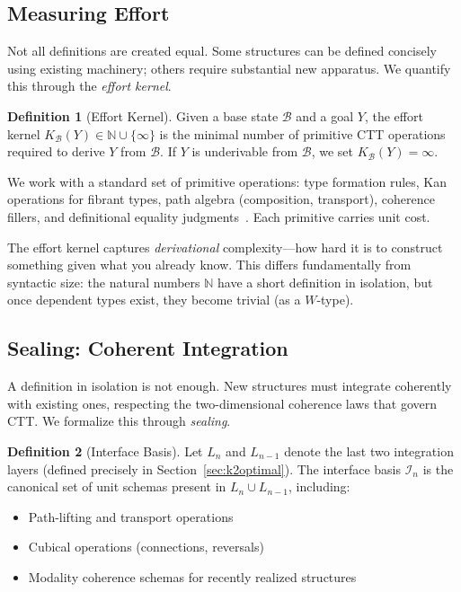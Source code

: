 \documentclass[11pt]{article}
\theoremstyle{definition}
\newtheorem{definition}{Definition}
\theoremstyle{plain}
\theoremstyle{remark}
\begin{document}
\subsection{Measuring Effort}

Not all definitions are created equal. Some structures can be defined concisely using existing machinery; others require substantial new apparatus. We quantify this through the \emph{effort kernel}.

\begin{definition}[Effort Kernel]
Given a base state $\mathcal{B}$ and a goal $Y$, the effort kernel $K_{\mathcal{B}}(Y) \in \mathbb{N} \cup \{\infty\}$ is the minimal number of primitive CTT operations required to derive $Y$ from $\mathcal{B}$. If $Y$ is underivable from $\mathcal{B}$, we set $K_{\mathcal{B}}(Y) = \infty$.
\end{definition}

We work with a standard set of primitive operations: type formation rules, Kan operations for fibrant types, path algebra (composition, transport), coherence fillers, and definitional equality judgments~\cite{hottbook}. Each primitive carries unit cost.

The effort kernel captures \emph{derivational} complexity—how hard it is to construct something given what you already know. This differs fundamentally from syntactic size: the natural numbers $\mathbb{N}$ have a short definition in isolation, but once dependent types exist, they become trivial (as a $W$-type).

\subsection{Sealing: Coherent Integration}

A definition in isolation is not enough. New structures must integrate coherently with existing ones, respecting the two-dimensional coherence laws that govern CTT. We formalize this through \emph{sealing}.

\begin{definition}[Interface Basis]
Let $L_n$ and $L_{n-1}$ denote the last two integration layers (defined precisely in Section~\ref{sec:k2optimal}). The interface basis $\mathcal{I}_n$ is the canonical set of unit schemas present in $L_n \cup L_{n-1}$, including:
\begin{itemize}
\item Path-lifting and transport operations
\item Cubical operations (connections, reversals)  
\item Modality coherence schemas for recently realized structures
\end{itemize}
\end{definition}
\end{document}
